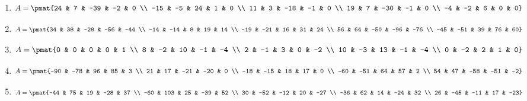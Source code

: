 \begin{enumerate}
\item

\begin{align*}
A = \pmat{24 & 7 & -39 & -2 & 0 \\ -15 & -5 & 24 & 1 & 0 \\ 11 & 3 & -18 & -1 & 0 \\ 19 & 7 & -30 & -1 & 0 \\ -4 & -2 & 6 & 0 & 0}
\end{align*}

\item

\begin{align*}
A = \pmat{34 & 38 & -28 & -56 & -44 \\ -14 & -14 & 8 & 19 & 14 \\ -19 & -21 & 16 & 31 & 24 \\ 56 & 64 & -50 & -96 & -76 \\ -45 & -51 & 39 & 76 & 60}
\end{align*}

\item

\begin{align*}
A = \pmat{0 & 0 & 0 & 0 & 1 \\ 8 & -2 & 10 & -1 & -4 \\ 2 & -1 & 3 & 0 & -2 \\ 10 & -3 & 13 & -1 & -4 \\ 0 & -2 & 2 & 1 & 0}
\end{align*}

\item

\begin{align*}
A = \pmat{-90 & -78 & 96 & 85 & 3 \\ 21 & 17 & -21 & -20 & 0 \\ -18 & -15 & 18 & 17 & 0 \\ -60 & -51 & 64 & 57 & 2 \\ 54 & 47 & -58 & -51 & -2}
\end{align*}

\item

\begin{align*}
A = \pmat{-44 & 75 & 19 & -28 & 37 \\ -60 & 103 & 25 & -39 & 52 \\ 30 & -52 & -12 & 20 & -27 \\ -36 & 62 & 14 & -24 & 32 \\ 26 & -45 & -11 & 17 & -23}
\end{align*}


\end{enumerate}
